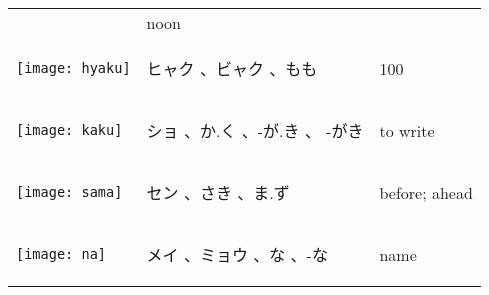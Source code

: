 \documentclass[a4paper,12pt]{extarticle}
\begin{document}
\begin{longtable}{|lp{6cm}p{4cm}|}
	                                   &
	noon
	\\
	\begin{minipage}{0.3\textwidth}
		\centerline{
			\texttt{[image: hyaku]}
		}
	\end{minipage}
	                                   &
	\begin{CJK}{UTF8}{min} ヒャク 、ビャク 、もも\end{CJK}
	                                   &
	100
	\\
	\begin{minipage}{0.3\textwidth}
		\centerline{
			\texttt{[image: kaku]}
		}
	\end{minipage}
	                                   &
	\begin{CJK}{UTF8}{min} ショ 、か.く 、-が.き 、 -がき\end{CJK}
	                                   &
	to write
	\\
	\begin{minipage}{0.3\textwidth}
		\centerline{
			\texttt{[image: sama]}
		}
	\end{minipage}
	                                   &
	\begin{CJK}{UTF8}{min} セン 、さき 、ま.ず\end{CJK}
	                                   &
	before; ahead
	\\
	\begin{minipage}{0.3\textwidth}
		\centerline{
			\texttt{[image: na]}
		}
	\end{minipage}
	                                   &
	\begin{CJK}{UTF8}{min}メイ 、ミョウ 、な 、-な\end{CJK}
	                                   &
	name
	\\

\end{longtable}
\end{document}
